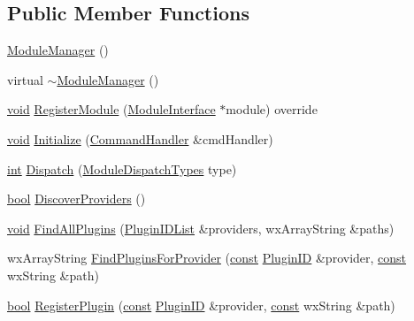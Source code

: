 \subsection*{Public Member Functions}
\begin{DoxyCompactItemize}
\item 
\hyperlink{class_module_manager_a2940b3dd370b9c454c7cc600c540bb0e}{Module\+Manager} ()
\item 
virtual \hyperlink{class_module_manager_a4f7e83d51dcbc461d2514f44d21aacb4}{$\sim$\+Module\+Manager} ()
\item 
\hyperlink{sound_8c_ae35f5844602719cf66324f4de2a658b3}{void} \hyperlink{class_module_manager_a87c3e704925fcfa8e21f3fe3dce54850}{Register\+Module} (\hyperlink{class_module_interface}{Module\+Interface} $\ast$module) override
\item 
\hyperlink{sound_8c_ae35f5844602719cf66324f4de2a658b3}{void} \hyperlink{class_module_manager_aa24d1307fc562d497706bcd9409a99a3}{Initialize} (\hyperlink{class_command_handler}{Command\+Handler} \&cmd\+Handler)
\item 
\hyperlink{xmltok_8h_a5a0d4a5641ce434f1d23533f2b2e6653}{int} \hyperlink{class_module_manager_a570d7a26f2684ca2eb0dc1daedd18145}{Dispatch} (\hyperlink{_scripter_callback_8cpp_a9f2f762f76ca014f9381eeabccdef359}{Module\+Dispatch\+Types} type)
\item 
\hyperlink{mac_2config_2i386_2lib-src_2libsoxr_2soxr-config_8h_abb452686968e48b67397da5f97445f5b}{bool} \hyperlink{class_module_manager_aadaae885edc750ca8469bd9a30e153d6}{Discover\+Providers} ()
\item 
\hyperlink{sound_8c_ae35f5844602719cf66324f4de2a658b3}{void} \hyperlink{class_module_manager_a7a17b09c856928d5491b1945f77b5856}{Find\+All\+Plugins} (\hyperlink{_plugin_manager_8h_a628abfc9a8462192a361cf3b4a1f11f4}{Plugin\+I\+D\+List} \&providers, wx\+Array\+String \&paths)
\item 
wx\+Array\+String \hyperlink{class_module_manager_af8b60dfe87a36058a171bdd7892ebdee}{Find\+Plugins\+For\+Provider} (\hyperlink{getopt1_8c_a2c212835823e3c54a8ab6d95c652660e}{const} \hyperlink{include_2audacity_2_types_8h_abe9b737fcebc2b5bea606246e1eab52e}{Plugin\+ID} \&provider, \hyperlink{getopt1_8c_a2c212835823e3c54a8ab6d95c652660e}{const} wx\+String \&path)
\item 
\hyperlink{mac_2config_2i386_2lib-src_2libsoxr_2soxr-config_8h_abb452686968e48b67397da5f97445f5b}{bool} \hyperlink{class_module_manager_a1f4871bc68a4547ce973ed2a17da1e25}{Register\+Plugin} (\hyperlink{getopt1_8c_a2c212835823e3c54a8ab6d95c652660e}{const} \hyperlink{include_2audacity_2_types_8h_abe9b737fcebc2b5bea606246e1eab52e}{Plugin\+ID} \&provider, \hyperlink{getopt1_8c_a2c212835823e3c54a8ab6d95c652660e}{const} wx\+String \&path)

\end{DoxyCompactItemize}
